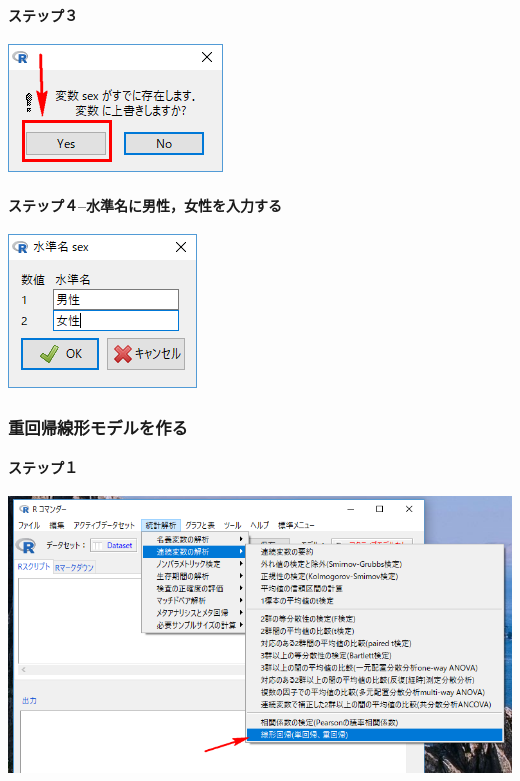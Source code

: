 \documentclass[11pt,]{problemset}
\let\oldparagraph\paragraph
\renewcommand{\paragraph}[1]{\oldparagraph{#1}\mbox{}}
\begin{document}
\paragraph{ステップ３}\label{-10}

\begin{center}\includegraphics[width=0.25\linewidth]{pic/sexfactor02} \end{center}

\newpage

\vfill

\paragraph{ステップ４--水準名に男性，女性を入力する}

\begin{center}\includegraphics[width=0.25\linewidth]{pic/sexfactor03} \end{center}

\subsubsection{重回帰線形モデルを作る}

\paragraph{ステップ１}\label{-11}

\begin{center}\includegraphics[width=0.7\linewidth]{pic/lm00} \end{center}
\end{document}
